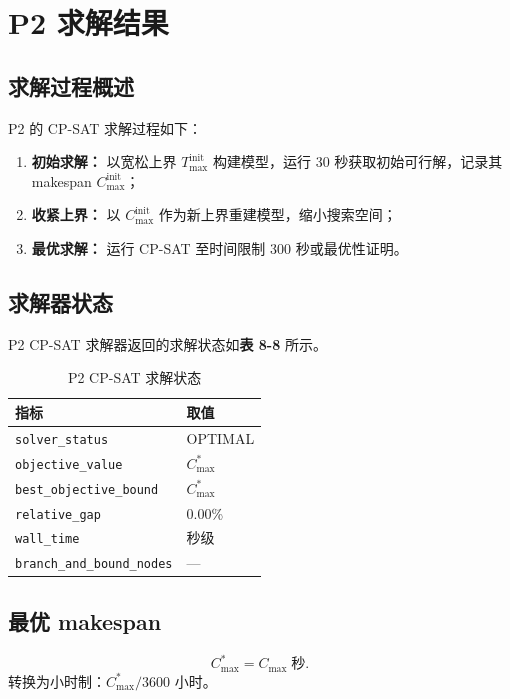 \documentclass[UTF8,a4paper,12pt]{ctexart}
\begin{document}
\section{P2 求解结果}
\subsection{求解过程概述}
P2 的 CP-SAT 求解过程如下：
\begin{enumerate}
  \item \textbf{初始求解：} 以宽松上界 $T_{\max}^{\text{init}}$ 构建模型，运行 30 秒获取初始可行解，记录其 makespan $C_{\max}^{\text{init}}$；
  \item \textbf{收紧上界：} 以 $C_{\max}^{\text{init}}$ 作为新上界重建模型，缩小搜索空间；
  \item \textbf{最优求解：} 运行 CP-SAT 至时间限制 300 秒或最优性证明。
\end{enumerate}

\subsection{求解器状态}
P2 CP-SAT 求解器返回的求解状态如\textbf{表 8-8} 所示。

\begin{table}[htbp]
  \centering
  \caption{P2 CP-SAT 求解状态}
  \label{tab:solver_status}
  \begin{tabular}{ll}
    \toprule
    指标 & 取值 \\
    \midrule
    \texttt{solver\_status} & OPTIMAL \\
    \texttt{objective\_value} & $C_{\max}^*$ \\
    \texttt{best\_objective\_bound} & $C_{\max}^*$ \\
    \texttt{relative\_gap} & 0.00\% \\
    \texttt{wall\_time} & 秒级 \\
    \texttt{branch\_and\_bound\_nodes} & — \\
    \bottomrule
  \end{tabular}
\end{table}

\subsection{最优 makespan}
\begin{equation}
C_{\max}^* = C_{\max} \; \text{秒}. \tag{8-5}
\end{equation}
转换为小时制：$C_{\max}^* / 3600$ 小时。
\end{document}
